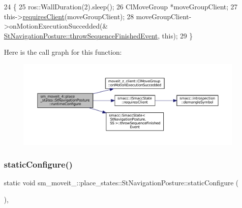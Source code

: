 \begin{DoxyCode}
24             \{
25                 ros::WallDuration(2).sleep();
26                 ClMoveGroup *moveGroupClient;
27                 this->\hyperlink{classsmacc_1_1ISmaccState_a7f95c9f0a6ea2d6f18d1aec0519de4ac}{requiresClient}(moveGroupClient);
28                 moveGroupClient->onMotionExecutionSuccedded(&
      \hyperlink{classsmacc_1_1SmaccState_a49dcfc25824f7e083dd4b999c49ab2b6}{StNavigationPosture::throwSequenceFinishedEvent}, \textcolor{keyword}{this});
29             \}
\end{DoxyCode}
Here is the call graph for this function\+:
\nopagebreak
\begin{figure}[H]
\begin{center}
\leavevmode
\includegraphics[width=350pt]{structsm__moveit__4_1_1place__states_1_1StNavigationPosture_aaf8ca02fa5a8185baf6bfc55731b1926_cgraph}
\end{center}
\end{figure}
\mbox{\label{structsm__moveit__4_1_1place__states_1_1StNavigationPosture_a29ac0c6cd858bb59ca3bc103da13b0a0}} 
\subsubsection{\texorpdfstring{static\+Configure()}{staticConfigure()}}
{\footnotesize\ttfamily static void sm\+\_\+moveit\+\_\+::place\+\_\+states\+::\+St\+Navigation\+Posture\+::static\+Configure (\begin{DoxyParamCaption}{ }\end{DoxyParamCaption})\hspace{0.3cm}{\ttfamily [inline]}, {\ttfamily [static]}}



